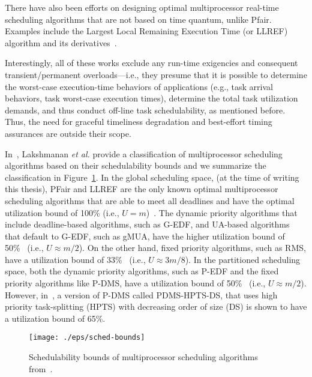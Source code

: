 \documentclass[12pt,dvips]{report}
\begin{document}
There have also been efforts on designing optimal multiprocessor real-time scheduling algorithms that are not based on time quantum, unlike Pfair.  Examples include the Largest Local Remaining Execution Time (or LLREF) algorithm and its derivatives~\cite{cho_llref, chen08, Funaoka08}.

Interestingly, all of these works exclude any run-time exigencies and consequent transient/permanent overloads---i.e., they presume that it is possible to determine the worst-case execution-time behaviors of applications (e.g., task arrival behaviors, task worst-case execution times), determine the total task utilization demands, and thus conduct off-line task schedulability, as mentioned before. Thus, the need for graceful timeliness degradation and best-effort timing assurances are outside their scope.

In~\cite{Lakshmanan09}, Lakshmanan \textit{et al.} provide a classification of multiprocessor scheduling algorithms based on their schedulability bounds and we summarize the classification in Figure~\ref{fig:schedbounds}. In the global scheduling space, (at the time of writing this thesis), PFair and LLREF are the only known optimal multiprocessor scheduling algorithms that are able to meet all deadlines and have the optimal utilization bound of 100\% (i.e., $U = m$)~\cite{pfair1}. The dynamic priority algorithms that include deadline-based algorithms, such as G-EDF, and UA-based algorithms that default to G-EDF, such as gMUA, have the higher utilization bound of 50\%~\cite{Baker05, cho-thesis06} (i.e., $U \approx m/2$). On the other hand, fixed priority algorithms, such as RMS, have a utilization bound of 33\%~\cite{Andersson01} (i.e., $U  \approx 3m/8$). In the partitioned scheduling space, both the dynamic priority algorithms, such as P-EDF and the fixed priority algorithms like P-DMS, have a utilization bound of 50\%~\cite{lopez04} (i.e., $U  \approx m/2$). However, in~\cite{Lakshmanan09}, a version of P-DMS called PDMS-HPTS-DS, that uses high priority task-splitting (HPTS) with decreasing order of size (DS) is shown to have a utilization bound of 65\%.

\begin{figure} [htbp]
  \centering
  \texttt{[image: ./eps/sched-bounds]}
  \caption{Schedulability bounds of multiprocessor scheduling algorithms from~\cite{Lakshmanan09}.}
  \label{fig:schedbounds}
\end{figure}
\end{document}
